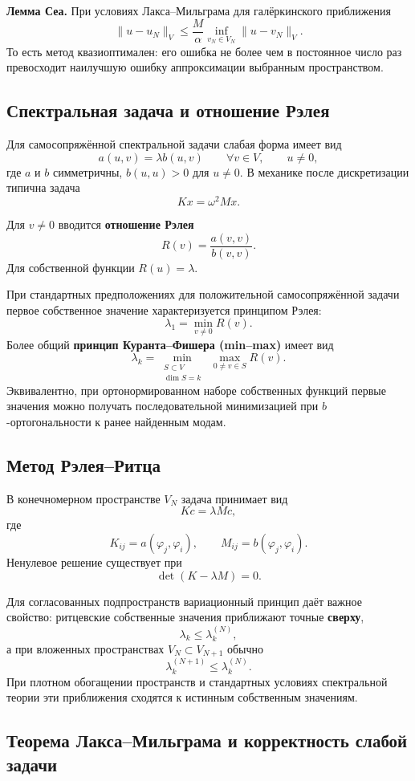\textbf{Лемма Сеа.} При условиях Лакса--Мильграма для галёркинского приближения
\[
\boxed{
\|u-u_N\|_V
\le
\frac{M}{\alpha}
\inf_{v_N\in V_N}\|u-v_N\|_V.
}
\]
То есть метод квазиоптимален: его ошибка не более чем в постоянное число раз превосходит наилучшую ошибку аппроксимации выбранным пространством.

\subsection{Спектральная задача и отношение Рэлея}

Для самосопряжённой спектральной задачи слабая форма имеет вид
\[
a(u,v)=\lambda b(u,v)
\qquad \forall v\in V,
\qquad u\ne0,
\]
где $a$ и $b$ симметричны, $b(u,u)>0$ для $u\ne0$. В механике после дискретизации типична задача
\[
Kx=\omega^2Mx.
\]

Для $v\ne0$ вводится \textbf{отношение Рэлея}
\[
R(v)=\frac{a(v,v)}{b(v,v)}.
\]
Для собственной функции $R(u)=\lambda$.

При стандартных предположениях для положительной самосопряжённой задачи первое собственное значение характеризуется принципом Рэлея:
\[
\boxed{\lambda_1=\min_{v\ne0}R(v)}.
\]
Более общий \textbf{принцип Куранта--Фишера (min--max)} имеет вид
\[
\boxed{
\lambda_k=
\min_{\substack{S\subset V\\ \dim S=k}}
\;\max_{0\ne v\in S}R(v).
}
\]
Эквивалентно, при ортонормированном наборе собственных функций первые значения можно получать последовательной минимизацией при $b$-ортогональности к ранее найденным модам.

\subsection{Метод Рэлея--Ритца}

В конечномерном пространстве $V_N$ задача принимает вид
\[
Kc=\lambda Mc,
\]
где
\[
K_{ij}=a(\varphi_j,\varphi_i),
\qquad
M_{ij}=b(\varphi_j,\varphi_i).
\]
Ненулевое решение существует при
\[
\det(K-\lambda M)=0.
\]

Для согласованных подпространств вариационный принцип даёт важное свойство: ритцевские собственные значения приближают точные \textbf{сверху},
\[
\lambda_k\le \lambda_k^{(N)},
\]
а при вложенных пространствах $V_N\subset V_{N+1}$ обычно
\[
\lambda_k^{(N+1)}\le \lambda_k^{(N)}.
\]
При плотном обогащении пространств и стандартных условиях спектральной теории эти приближения сходятся к истинным собственным значениям.


\subsection{Теорема Лакса--Мильграма и корректность слабой задачи}

